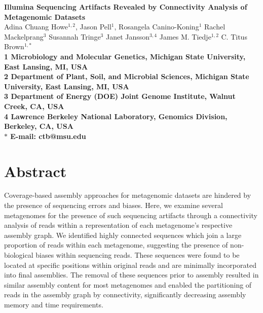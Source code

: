 \documentclass[10pt]{article}
\date{}
\begin{document}
\begin{flushleft}
{\Large
\textbf{Illumina Sequencing Artifacts Revealed by Connectivity Analysis of Metagenomic Datasets}
}
\\
Adina Chuang Howe$^{1,2}$, 
Jason Pell$^{1}$,
Rosangela Canino-Koning$^{1}$
Rachel Mackelprang$^{3}$
Susannah Tringe$^{3}$
Janet Jansson$^{3,4}$ 
James M. Tiedje$^{1,2}$
C. Titus Brown$^{1,\ast}$
\\
\bf{1} Microbiology and Molecular Genetics, Michigan State University, East Lansing, MI, USA
\\
\bf{2} Department of Plant, Soil, and Microbial Sciences, Michigan State University, East Lansing, MI, USA
\\
\bf{3} Department of Energy (DOE) Joint Genome Institute, Walnut Creek, CA, USA
\\
\bf{4} Lawrence Berkeley National Laboratory, Genomics Division, Berkeley, CA, USA
\\
$\ast$ E-mail: ctb@msu.edu
\end{flushleft}

\section*{Abstract}
Coverage-based assembly approaches for metagenomic datasets are hindered by the presence of sequencing errors and biases.  Here, we examine several metagenomes for the presence of such sequencing artifacts through a connectivity analysis of reads within a representation of each metagenome's respective assembly graph.  We identified highly connected sequences which join a large proportion of reads within each metagenome, suggesting the presence of non-biological biases within sequencing reads.  These sequences were found to be located at specific positions within original reads and are minimally incorporated into final assemblies.  The removal of these sequences prior to assembly resulted in similar assembly content for most metagenomes and enabled the partitioning of reads in the assembly graph by connectivity, significantly decreasing assembly memory and time requirements.    
\end{document}
